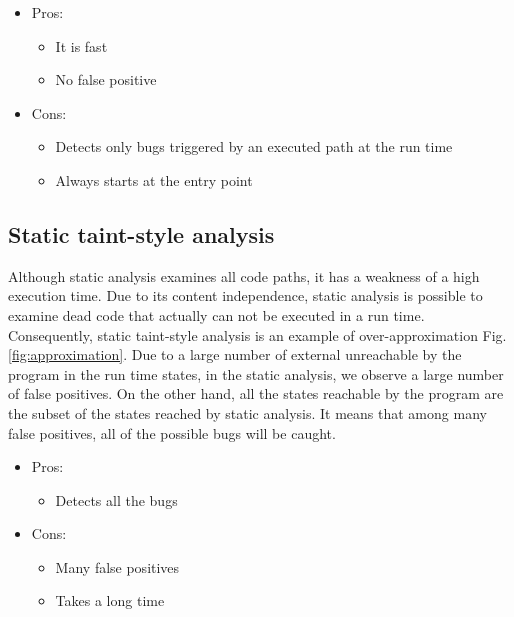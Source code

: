 \documentclass[a4paper, 12pt, journal, onecolumn]{IEEEtran}
\begin{document}
\begin{itemize}
\item Pros:	

\begin{itemize}
\item It is fast	
\item No false positive
\end{itemize}

\item Cons:

\begin{itemize}
\item Detects only bugs triggered by an executed path at the run time
\item Always starts at the entry point
\end{itemize}

\end{itemize}

\subsection{Static taint-style analysis}

Although static analysis examines all code paths, it has a weakness of a high execution time. Due to its content independence, static analysis is possible to examine dead code that actually can not be executed in a run time. Consequently, static taint-style analysis is an example of over-approximation Fig.\ref{fig:approximation}.
Due to a large number of external unreachable by the program in the run time states, in the static analysis, we observe a large number of false positives. On the other hand, all the states reachable by the program are the subset of the states reached by static analysis. It means that among many false positives, all of the possible bugs will be caught. \cite{a5}\cite{a6}

\begin{itemize}
\item Pros:	

\begin{itemize}
\item Detects all the bugs

\end{itemize}

\item Cons:

\begin{itemize}
\item Many false positives

\item Takes a long time
\end{itemize}

\end{itemize}
\end{document}
